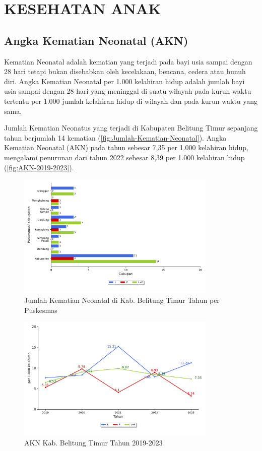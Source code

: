 \section{KESEHATAN ANAK}
\subsection{Angka Kematian Neonatal (AKN)}
Kematian Neonatal adalah kematian yang terjadi pada bayi usia sampai dengan 28 hari tetapi bukan disebabkan oleh kecelakaan, bencana, cedera atau bunuh diri. Angka Kematian Neonatal per 1.000 kelahiran hidup adalah jumlah bayi usia sampai dengan 28 hari yang meninggal di suatu wilayah pada kurun waktu tertentu per 1.000 jumlah kelahiran hidup di wilayah dan pada kurun waktu yang sama.

Jumlah Kematian Neonatus yang terjadi di Kabupaten Belitung Timur sepanjang tahun \tP berjumlah 14 kematian (\autoref{fig:Jumlah-Kematian-Neonatal}). Angka Kematian Neonatal (AKN) pada tahun \tP sebesar 7,35 per 1.000 kelahiran hidup, mengalami penurunan dari tahun 2022 sebesar 8,39 per 1.000 kelahiran hidup (\autoref{fig:AKN-2019-2023}).

\begin{figure}[H]
    \centering{}
    \includegraphics[width=0.85\textwidth]{bab_05/bab_05_09_kematianNeonatal}
    \caption{Jumlah Kematian Neonatal di Kab. Belitung Timur Tahun \tP per Puskesmas}
    \label{fig:Jumlah-Kematian-Neonatal}
\end{figure}

\begin{figure}[H]
    \centering{}
    \includegraphics[width=0.85\textwidth]{bab_05/bab_05_09_plotNeonatal}
    \caption{AKN Kab. Belitung Timur Tahun 2019-2023}
    \label{fig:AKN-2019-2023}
\end{figure}


